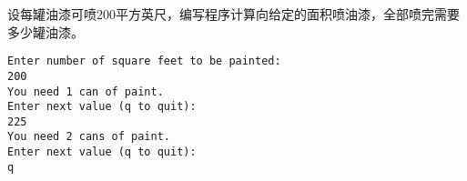 \begin{frame}[fragile]\ft{\secname}
\begin{li}
设每罐油漆可喷200平方英尺，编写程序计算向给定的面积喷油漆，全部喷完需要多少罐油漆。
\end{li}
\end{frame}

\begin{frame}\ft{\secname}


\end{frame}

\begin{frame}[fragile]\ft{\secname}
\begin{lstlisting}
Enter number of square feet to be painted:
200
You need 1 can of paint.
Enter next value (q to quit):
225
You need 2 cans of paint.
Enter next value (q to quit):
q
\end{lstlisting}
\end{frame}


